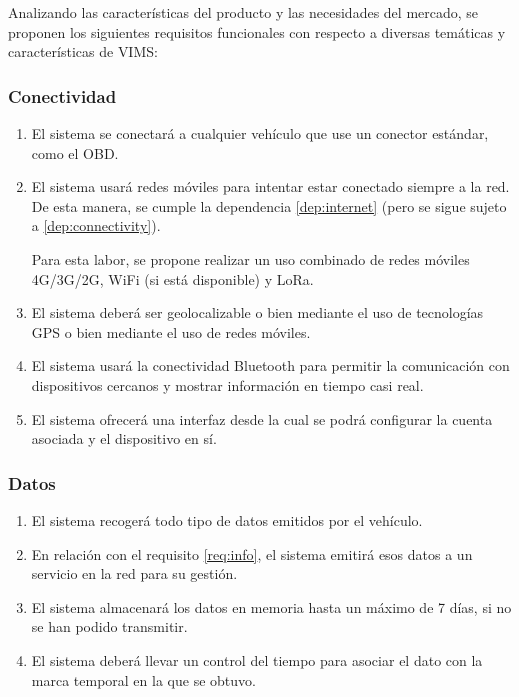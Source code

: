 Analizando las características del producto y las necesidades del mercado, se
proponen los siguientes requisitos funcionales con respecto a diversas temáticas
y características de \ac{VIMS}:

\subsubsection{Conectividad}
\begin{enumerate}[label=\textbf{\texttt{RF-\arabic*}}]
  \item\label{req:connectivity} El sistema se conectará a cualquier vehículo que use
        un conector estándar, como el \ac{OBD}.
  \item\label{req:network} El sistema usará redes móviles para intentar
        estar conectado siempre a la red. De esta manera, se cumple la dependencia
        \ref{dep:internet} (pero se sigue sujeto a \ref{dep:connectivity}).

        Para esta labor, se propone realizar un uso combinado de redes móviles 4G/3G/2G,
        WiFi (si está disponible) y LoRa.
  \item\label{req:gps} El sistema deberá ser geolocalizable o bien mediante el uso
        de tecnologías GPS o bien mediante el uso de redes móviles.
  \item\label{req:bt} El sistema usará la conectividad Bluetooth para
        permitir la comunicación con dispositivos cercanos y mostrar información en
        tiempo casi real.
  \item\label{req:conf} El sistema ofrecerá una interfaz desde la cual se podrá
        configurar la cuenta asociada y el dispositivo en sí.
\end{enumerate}

\subsubsection{Datos}
\begin{enumerate}[resume, label=\textbf{\texttt{RF-\arabic*}}]
  \item\label{req:info} El sistema recogerá todo tipo de datos emitidos por el
        vehículo.
  \item\label{req:transmission} En relación con el requisito \ref{req:info},
        el sistema emitirá esos datos a un servicio en la red para su gestión.
  \item\label{req:storage} El sistema almacenará los datos en memoria hasta un máximo
        de 7 días, si no se han podido transmitir.
  \item\label{req:time} El sistema deberá llevar un control del tiempo para asociar
        el dato con la marca temporal en la que se obtuvo.
\end{enumerate}

